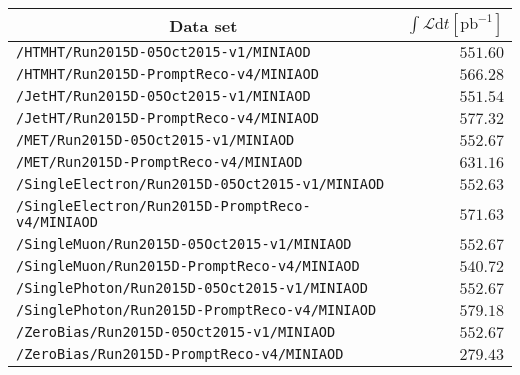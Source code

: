 \begin{center}
\begin{tabular}{lr}
\hline\hline
\multicolumn{1}{c}{Data set}&\multicolumn{1}{c}{$\int\mathcal{L}\textrm{d}t [\textrm{pb}^{-1}]$}\tabularnewline
\hline
\verb!/HTMHT/Run2015D-05Oct2015-v1/MINIAOD! &$551.60$\tabularnewline
\verb!/HTMHT/Run2015D-PromptReco-v4/MINIAOD! &$566.28$\tabularnewline
\verb!/JetHT/Run2015D-05Oct2015-v1/MINIAOD! &$551.54$\tabularnewline
\verb!/JetHT/Run2015D-PromptReco-v4/MINIAOD! &$577.32$\tabularnewline
\verb!/MET/Run2015D-05Oct2015-v1/MINIAOD! &$552.67$\tabularnewline
\verb!/MET/Run2015D-PromptReco-v4/MINIAOD! &$631.16$\tabularnewline
\verb!/SingleElectron/Run2015D-05Oct2015-v1/MINIAOD! &$552.63$\tabularnewline
\verb!/SingleElectron/Run2015D-PromptReco-v4/MINIAOD! &$571.63$\tabularnewline
\verb!/SingleMuon/Run2015D-05Oct2015-v1/MINIAOD! &$552.67$\tabularnewline
\verb!/SingleMuon/Run2015D-PromptReco-v4/MINIAOD! &$540.72$\tabularnewline
\verb!/SinglePhoton/Run2015D-05Oct2015-v1/MINIAOD! &$552.67$\tabularnewline
\verb!/SinglePhoton/Run2015D-PromptReco-v4/MINIAOD! &$579.18$\tabularnewline
\verb!/ZeroBias/Run2015D-05Oct2015-v1/MINIAOD! &$552.67$\tabularnewline
\verb!/ZeroBias/Run2015D-PromptReco-v4/MINIAOD! &$279.43$\tabularnewline
\hline
\end{tabular}\end{center}
